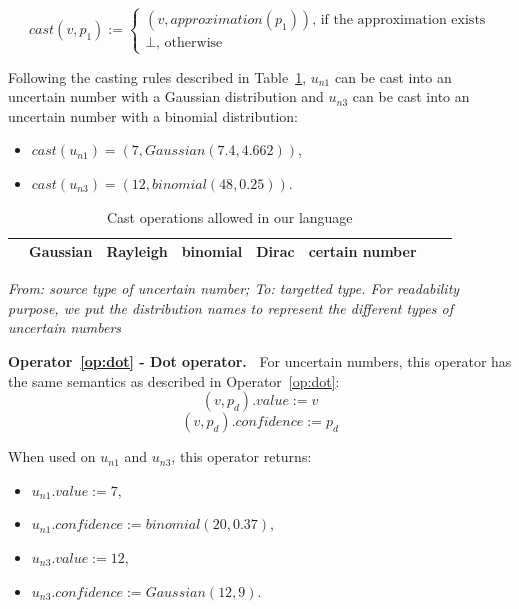 $$cast(v, p_1) := \begin{cases}
 								(v, approximation(p_1)) \text{, if the approximation exists}\\
 								\perp \text{, otherwise}
 							\end{cases}$$

Following the casting rules described in Table~\ref{table:allowed-cast-op},  $u_{n1}$ can be cast into an uncertain number with a Gaussian distribution and $u_{n3}$ can be cast into an uncertain number with a binomial distribution:
\begin{itemize}
	\item $cast(u_{n1}) = (7, Gaussian(7.4, 4.662))$,
	\item $cast(u_{n3}) = (12, binomial(48, 0.25))$.
\end{itemize}

\begin{table}
	\centering
		\begin{tabular}{|c|c|c|c|c|c|c|c|}
			\hline	
			\diagbox{To}{From} & Gaussian & Rayleigh & binomial & Dirac & certain number\\
			\hline
			\hline
		\end{tabular}%
	{\small
	\textit{From: source type of uncertain number; To: targetted type. For readability purpose, we put the distribution names to represent the different types of uncertain numbers}
	}
	\caption{Cast operations allowed in our language}
	\label{table:allowed-cast-op}
\end{table}

\bigskip

\noindent\textbf{Operator~\ref{op:dot} - Dot operator.~}
For uncertain numbers, this operator has the same semantics as described in Operator~\ref{op:dot}:
$$(v, p_d).value := v$$
$$(v, p_d).confidence := p_d$$

When used on $u_{n1}$ and $u_{n3}$, this operator returns:
\begin{itemize}
	\item $u_{n1}.value := 7$,
	\item $u_{n1}.confidence := binomial(20, 0.37)$,
	\item $u_{n3}.value := 12$,
	\item $u_{n3}.confidence := Gaussian(12, 9)$.
\end{itemize}

